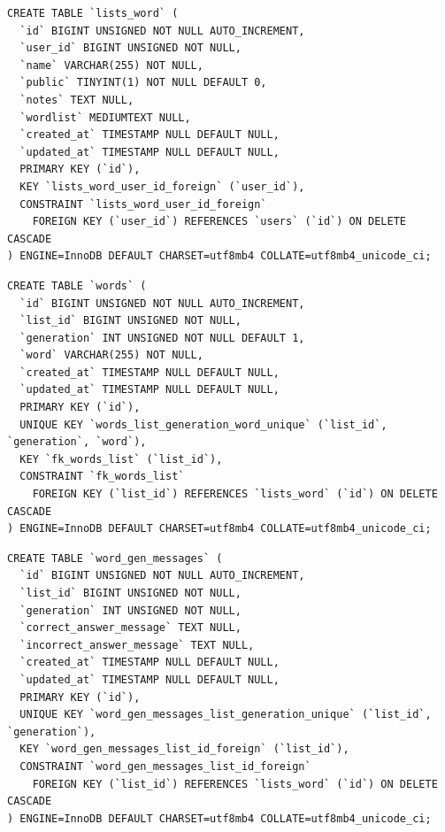 \documentclass{thesis-ekf}
\begin{document}
\begin{lstlisting}[style=mysqlstyle]
CREATE TABLE `lists_word` (
  `id` BIGINT UNSIGNED NOT NULL AUTO_INCREMENT,
  `user_id` BIGINT UNSIGNED NOT NULL,
  `name` VARCHAR(255) NOT NULL,
  `public` TINYINT(1) NOT NULL DEFAULT 0,
  `notes` TEXT NULL,
  `wordlist` MEDIUMTEXT NULL,
  `created_at` TIMESTAMP NULL DEFAULT NULL,
  `updated_at` TIMESTAMP NULL DEFAULT NULL,
  PRIMARY KEY (`id`),
  KEY `lists_word_user_id_foreign` (`user_id`),
  CONSTRAINT `lists_word_user_id_foreign`
    FOREIGN KEY (`user_id`) REFERENCES `users` (`id`) ON DELETE CASCADE
) ENGINE=InnoDB DEFAULT CHARSET=utf8mb4 COLLATE=utf8mb4_unicode_ci;
\end{lstlisting}

\begin{lstlisting}[style=mysqlstyle]
CREATE TABLE `words` (
  `id` BIGINT UNSIGNED NOT NULL AUTO_INCREMENT,
  `list_id` BIGINT UNSIGNED NOT NULL,
  `generation` INT UNSIGNED NOT NULL DEFAULT 1,
  `word` VARCHAR(255) NOT NULL,
  `created_at` TIMESTAMP NULL DEFAULT NULL,
  `updated_at` TIMESTAMP NULL DEFAULT NULL,
  PRIMARY KEY (`id`),
  UNIQUE KEY `words_list_generation_word_unique` (`list_id`, `generation`, `word`),
  KEY `fk_words_list` (`list_id`),
  CONSTRAINT `fk_words_list`
    FOREIGN KEY (`list_id`) REFERENCES `lists_word` (`id`) ON DELETE CASCADE
) ENGINE=InnoDB DEFAULT CHARSET=utf8mb4 COLLATE=utf8mb4_unicode_ci;
\end{lstlisting}

\begin{lstlisting}[style=mysqlstyle]
CREATE TABLE `word_gen_messages` (
  `id` BIGINT UNSIGNED NOT NULL AUTO_INCREMENT,
  `list_id` BIGINT UNSIGNED NOT NULL,
  `generation` INT UNSIGNED NOT NULL,
  `correct_answer_message` TEXT NULL,
  `incorrect_answer_message` TEXT NULL,
  `created_at` TIMESTAMP NULL DEFAULT NULL,
  `updated_at` TIMESTAMP NULL DEFAULT NULL,
  PRIMARY KEY (`id`),
  UNIQUE KEY `word_gen_messages_list_generation_unique` (`list_id`, `generation`),
  KEY `word_gen_messages_list_id_foreign` (`list_id`),
  CONSTRAINT `word_gen_messages_list_id_foreign`
    FOREIGN KEY (`list_id`) REFERENCES `lists_word` (`id`) ON DELETE CASCADE
) ENGINE=InnoDB DEFAULT CHARSET=utf8mb4 COLLATE=utf8mb4_unicode_ci;
\end{lstlisting}
\end{document}
